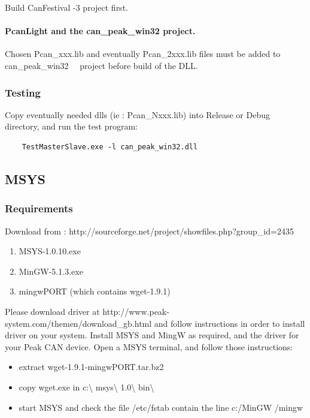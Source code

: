 \documentclass[12pt,english,a4paper]{book}
\begin{document}
Build CanFestival -3 project first.


\paragraph{PcanLight and the can\_peak\_win32 project.}

Chosen Pcan\_xxx.lib and eventually Pcan\_2xxx.lib files must be added
to can\_peak\_win32 \ \ project before build of the DLL.


\subsubsection{Testing}

Copy eventually needed dlls (ie : Pcan\_Nxxx.lib) into Release or
Debug directory, and run the test program:


\begin{verbatim}
	TestMasterSlave.exe -l can_peak_win32.dll
\end{verbatim}


\subsection{MSYS}


\subsubsection{Requirements}

Download from : http://sourceforge.net/project/showfiles.php?group\_id=2435

\begin{enumerate}
\item MSYS-1.0.10.exe 
\item MinGW-5.1.3.exe 
\item mingwPORT (which contains wget-1.9.1) 
\end{enumerate}
Please download driver at http://www.peak-system.com/themen/download\_gb.html
and follow instructions in order to install driver on your system.
Install MSYS and MingW as required, and the driver for your Peak CAN
device. Open a MSYS terminal, and follow those instructions:\\


\begin{itemize}
\item extract wget-1.9.1-mingwPORT.tar.bz2 
\item copy wget.exe in c:\textbackslash{} msys\textbackslash{} 1.0\textbackslash{}
bin\textbackslash{} 
\item start MSYS and check the file /etc/fstab contain the line c:/MinGW
/mingw 
\end{itemize}
\end{document}
